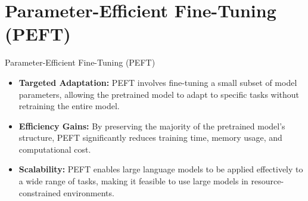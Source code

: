\documentclass[serif, aspectratio=169]{beamer}
\begin{document}
\section{Parameter-Efficient Fine-Tuning (PEFT)}
\begin{frame}{Parameter-Efficient Fine-Tuning (PEFT)}
    \begin{itemize}
        \item  
            \textbf{Targeted Adaptation:}
             PEFT involves fine-tuning a small subset of model parameters, allowing the pretrained model to adapt to specific tasks without retraining the entire model.
            \vspace{0.3cm}
        \item  
            \textbf{Efficiency Gains:}
              By preserving the majority of the pretrained model’s structure, PEFT significantly reduces training time, memory usage, and computational cost.
            \vspace{0.3cm}
        \item  
            \textbf{Scalability:}
              PEFT enables large language models to be applied effectively to a wide range of tasks, making it feasible to use large models in resource-constrained environments.
            \vspace{0.3cm}
    \end{itemize}
\end{frame}
\end{document}
